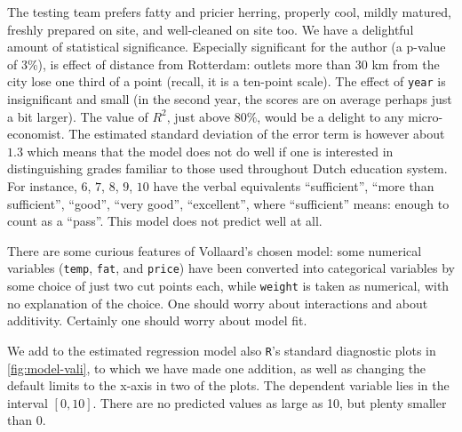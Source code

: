 \documentclass[alpha-refs]{wiley-article}
\begin{document}
The testing team prefers fatty and pricier herring, properly cool, mildly matured, freshly prepared on site, and well-cleaned on site too. We have a delightful amount of statistical significance. Especially significant for the author (a p-value of 3\%), is effect of distance from Rotterdam: outlets more than 30 km from the city lose one third of a point (recall, it is a ten-point scale). The effect of \texttt{year} is insignificant and small (in the second year, the scores are on average perhaps just a bit larger). The value of $R^2$, just above $80\%$, would be a delight to any micro-economist. The estimated standard deviation of the error term is however about $1.3$ which means that the model does not do well if one is interested in distinguishing grades familiar to those used throughout Dutch education system. For instance, $6$, $7$, $8$, $9$, $10$ have the verbal equivalents ``sufficient'', ``more than sufficient'', ``good'', ``very good'', ``excellent'', where ``sufficient'' means: enough to count as a ``pass''. This model does not predict well at all.

There are some curious features of Vollaard's chosen model: some numerical variables (\texttt{temp}, \texttt{fat}, and \texttt{price}) have been converted into categorical variables by some choice of just two cut points each, while \texttt{weight} is taken as numerical, with no explanation of the choice. One should worry about interactions and about additivity. Certainly one should worry about model fit.

We add to the estimated regression model also \texttt{R}'s standard diagnostic plots in \cref{fig:model-vali}, to which we have made one addition, as well as changing the default limits to the x-axis in two of the plots. The dependent variable lies in the interval $[0, 10]$. There are no predicted values as large as 10, but plenty smaller than 0. 
\end{document}
